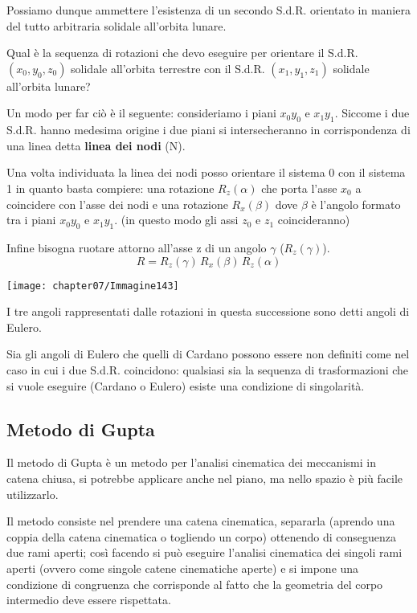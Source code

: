 Possiamo dunque ammettere l'esistenza di un secondo S.d.R. orientato in maniera del tutto arbitraria solidale all'orbita lunare. 

\begin{minipage}{.5\textwidth}
Qual è la sequenza di rotazioni che devo eseguire per orientare il S.d.R. $(x_0, y_0, z_0)$ solidale all'orbita terrestre con il S.d.R. $(x_1, y_1, z_1)$ solidale all'orbita lunare?\newline

Un modo per far ciò è il seguente: consideriamo i piani $x_0 y_0$ e $x_1 y_1$. Siccome i due S.d.R. hanno medesima origine i due piani si intersecheranno in corrispondenza di una linea detta \textbf{linea dei nodi} (N).

Una volta individuata la linea dei nodi posso orientare il sistema 0 con il sistema 1 in quanto basta compiere: una rotazione $R_z(\alpha)$ che porta l'asse $x_0$ a coincidere con l'asse dei nodi e una rotazione $R_x(\beta)$ dove $\beta$ è l'angolo formato tra i piani $x_0 y_0$ e $x_1 y_1$. (in questo modo gli assi $z_0$ e $z_1$ coincideranno)

Infine bisogna ruotare attorno all'asse z di un angolo $\gamma$ ($R_z(\gamma)$).
\[R = R_z(\gamma)\,R_x(\beta)\,R_z(\alpha)\]
\end{minipage}
\hfill
\begin{minipage}{.5\textwidth}
\centering
\texttt{[image: chapter07/Immagine143]}
\end{minipage}
\vspace{1mm}

I tre angoli rappresentati dalle rotazioni in questa successione sono detti angoli di Eulero.

Sia gli angoli di Eulero che quelli di Cardano possono essere non definiti come nel caso in cui i due S.d.R. coincidono: qualsiasi sia la sequenza di trasformazioni che si vuole eseguire (Cardano o Eulero) esiste una condizione di singolarità.

\subsection{Metodo di Gupta}

Il metodo di Gupta è un metodo per l'analisi cinematica dei meccanismi in catena chiusa, si potrebbe applicare anche nel piano, ma nello spazio è più facile utilizzarlo.

Il metodo consiste nel prendere una catena cinematica, separarla (aprendo una coppia della catena cinematica o togliendo un corpo) ottenendo di conseguenza due rami aperti; così facendo si può eseguire l'analisi cinematica dei singoli rami aperti (ovvero come singole catene cinematiche aperte) e si impone una condizione di congruenza che corrisponde al fatto che la geometria del corpo intermedio deve essere rispettata.\newline

